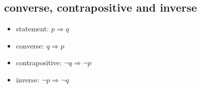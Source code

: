 \documentclass{article}
\begin{document}
\begin{itemize}
          \subsection{converse, contrapositive and inverse}

          \begin{itemize}
              \item statement: $p \Rightarrow  q$
              \item converse: $q \Rightarrow p$
              \item contrapositive: $\lnot q \Rightarrow \lnot p$
              \item inverse: $\lnot p \Rightarrow \lnot q$
          \end{itemize}
\end{itemize}
\end{document}
